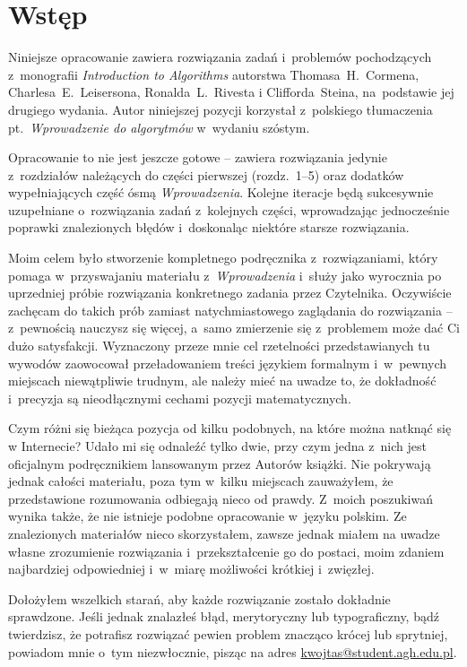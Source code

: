 \chapter{Wstęp}

Niniejsze opracowanie zawiera rozwiązania zadań i~problemów pochodzących z~monografii \textsl{Introduction to Algorithms} \cite{cormen} autorstwa Thomasa~H.~Cormena, Charlesa~E.~Leisersona, Ronalda~L.~Rivesta i Clifforda~Steina, na~podstawie jej drugiego wydania. Autor niniejszej pozycji korzystał z~polskiego tłumaczenia pt.\ \textsl{Wprowadzenie do algorytmów} \cite{cormenpl} w~wydaniu szóstym.

Opracowanie to nie jest jeszcze gotowe -- zawiera rozwiązania jedynie z~rozdziałów należących do części pierwszej (rozdz.~1\nobreakdash--5) oraz dodatków wypełniających część ósmą \textsl{Wprowadzenia}. Kolejne iteracje będą sukcesywnie uzupełniane o~rozwiązania zadań z~kolejnych części, wprowadzając jednocześnie poprawki znalezionych błędów i~doskonaląc niektóre starsze rozwiązania.

Moim celem było stworzenie kompletnego podręcznika z~rozwiązaniami, który pomaga w~przyswajaniu materiału z~\textsl{Wprowadzenia} i~służy jako wyrocznia po uprzedniej próbie rozwiązania konkretnego zadania przez Czytelnika. Oczywiście zachęcam do takich prób zamiast natychmiastowego zaglądania do rozwiązania -- z~pewnością nauczysz się więcej, a~samo zmierzenie się z~problemem może dać Ci dużo satysfakcji. Wyznaczony przeze mnie cel rzetelności przedstawianych tu wywodów zaowocował przeładowaniem treści językiem formalnym i~w~pewnych miejscach niewątpliwie trudnym, ale należy mieć na uwadze to, że dokładność i~precyzja są nieodłącznymi cechami pozycji matematycznych.

Czym różni się bieżąca pozycja od kilku podobnych, na które można natknąć się w Internecie? Udało mi się odnaleźć tylko dwie, przy czym jedna z~nich jest oficjalnym podręcznikiem lansowanym przez Autorów książki. Nie pokrywają jednak całości materiału, poza tym w~kilku miejscach zauważyłem, że przedstawione rozumowania odbiegają nieco od prawdy. Z~moich poszukiwań wynika także, że nie istnieje podobne opracowanie w~języku polskim. Ze znalezionych materiałów nieco skorzystałem, zawsze jednak miałem na uwadze własne zrozumienie rozwiązania i~przekształcenie go do postaci, moim zdaniem najbardziej odpowiedniej i~w~miarę możliwości krótkiej i~zwięzłej.

Dołożyłem wszelkich starań, aby każde rozwiązanie zostało dokładnie sprawdzone. Jeśli jednak znalazłeś błąd, merytoryczny lub typograficzny, bądź twierdzisz, że potrafisz rozwiązać pewien problem znacząco krócej lub sprytniej, powiadom mnie o~tym niezwłocznie, pisząc na adres \url{kwojtas@student.agh.edu.pl}.


